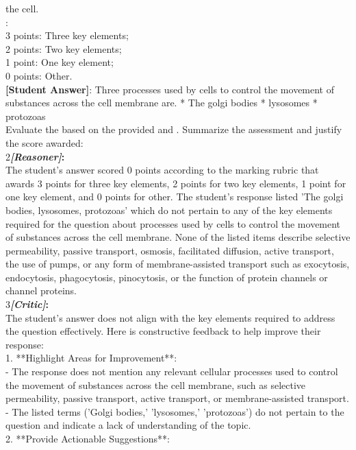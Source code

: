 \begin{figure*}
\begin{tcolorbox}[
    colback=gray!10,      %
    colframe=gray!80,     %
    title=Case Study 2,
    fonttitle=\bfseries,  %
    rounded corners,
    boxrule=0.5mm,        %
    width=\linewidth
]
the cell.\\
:\\
3 points: Three key elements;\\
2 points: Two key elements;\\
1 point: One key element;\\
0 points: Other.\\
\textbf{[Student Answer]}: Three processes used by cells to control the movement of substances across the cell membrane are. * The golgi bodies  * lysosomes * protozoas\\
Evaluate the  based on the provided  and . Summarize the assessment and justify the score awarded:\\
\textcircled{\raisebox{-0.3pt} {\scriptsize2}}\textbf{\emph{[Reasoner]}:}\\
The student's answer scored 0 points according to the marking rubric that awards 3 points for three key elements, 2 points for two key elements, 1 point for one key element, and 0 points for other. The student's response listed 'The golgi bodies, lysosomes, protozoas' which do not pertain to any of the key elements required for the question about processes used by cells to control the movement of substances across the cell membrane. None of the listed items describe selective permeability, passive transport, osmosis, facilitated diffusion, active transport, the use of pumps, or any form of membrane-assisted transport such as exocytosis, endocytosis, phagocytosis, pinocytosis, or the function of protein channels or channel proteins.\\
\textcircled{\raisebox{-0.3pt} {\scriptsize3}}\textbf{\emph{[Critic]}:}\\
 The student's answer does not align with the key elements required to address the question effectively. Here is constructive feedback to help improve their response:\\
1. **Highlight Areas for Improvement**:  \\
   - The response does not mention any relevant cellular processes used to control the movement of substances across the cell membrane, such as selective permeability, passive transport, active transport, or membrane-assisted transport.  \\
   - The listed terms ('Golgi bodies,' 'lysosomes,' 'protozoas') do not pertain to the question and indicate a lack of understanding of the topic.\\
   2. **Provide Actionable Suggestions**:  \\

\end{tcolorbox}
\end{figure*}
